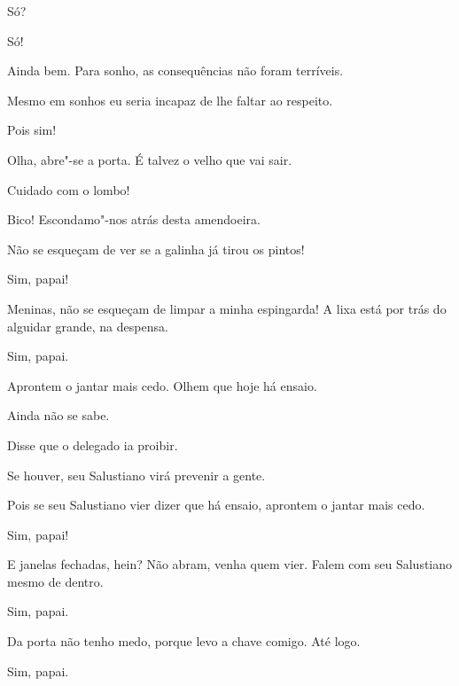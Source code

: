 \begin{linenumbers}
 Só? 

 Só!

 Ainda bem. Para sonho, as
consequências não foram terríveis.  

  
Mesmo em sonhos eu seria incapaz de lhe faltar ao respeito.

 Pois sim!

  Olha, abre"-se a porta. É
talvez o velho que vai sair.

 Cuidado com o lombo!

 Bico!
Escondamo"-nos atrás desta amendoeira.



  Não se esqueçam de ver se a galinha
já tirou os pintos!

 Sim, papai!

 Meninas, não se esqueçam
de limpar a minha espingarda! A lixa está por trás
do alguidar grande, na despensa.

  Sim, papai.

 Aprontem o jantar mais cedo. Olhem que hoje há ensaio.

  Ainda não se sabe. 

  Disse que o delegado ia proibir. 

 Se houver, seu Salustiano virá prevenir a gente. 

 Pois se seu
Salustiano vier dizer que há ensaio, aprontem o
jantar mais cedo. 

 Sim, papai!

  E janelas fechadas, hein? Não abram, venha quem vier. Falem com
seu Salustiano mesmo de dentro. 

 Sim, papai.

  Da porta não tenho medo, porque
levo a chave comigo.  Até logo. 

 Sim, papai.


\end{linenumbers}
